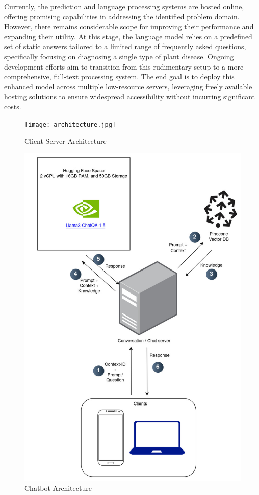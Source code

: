 Currently, the prediction and language processing systems are hosted online, offering promising capabilities in addressing the identified problem domain. However, there remains considerable scope for improving their performance and expanding their utility. At this stage, the language model relies on a predefined set of static answers tailored to a limited range of frequently asked questions, specifically focusing on diagnosing a single type of plant disease. Ongoing development efforts aim to transition from this rudimentary setup to a more comprehensive, full-text processing system. The end goal is to deploy this enhanced model across multiple low-resource servers, leveraging freely available hosting solutions to ensure widespread accessibility without incurring significant costs.


\begin{figure}[h!]
    \centering
    \texttt{[image: architecture.jpg]}
    \caption{Client-Server Architecture}
    \label{fig:client_server_arch}
\end{figure}


\begin{figure}[h!]
    \centering
    \includegraphics[scale=0.5]{images/chatbot_arch.jpg}
    \caption{Chatbot Architecture}
    \label{fig:chatbot_arch}
\end{figure}


